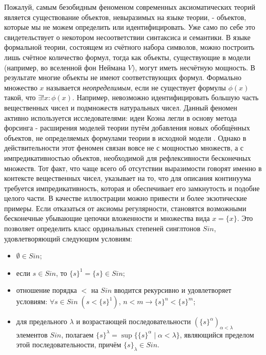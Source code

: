 \documentclass[12pt]{article}
\begin{document}
Пожалуй, самым безобидным феноменом современных аксиоматических теорий является существование объектов, невыразимых на языке теории, - объектов, которые мы не можем определить или идентифицировать. Уже само по себе это свидетельствует о некотором несоответствии синтаксиса и семантики. В языке формальной теории, состоящем из счётного набора символов, можно построить лишь счётное количество формул, тогда как объекты, существующие в модели (например, во вселенной фон Неймана $V$), могут иметь несчётную мощность. В результате многие объекты не имеют соответствующих формул. Формально множество $x$ называется {\it неопределимым}, если не существует формулы $\phi(x)$ такой, что $\exists! x : \phi(x)$. Например, невозможно идентифицировать большую часть вещественных чисел и подмножеств натуральных чисел. Данный феномен активно используется исследователями: идеи Коэна легли в основу метода форсинга - расширения моделей теории путём добавления новых обобщённых объектов, не определяемых формулами теории в исходной модели \cite{forcing}. Однако в действительности этот феномен связан вовсе не с мощностью множеств, а с импредикативностью объектов, необходимой для рефлексивности бесконечных множеств. Тот факт, что чаще всего об отсутствии выразимости говорят именно в контексте вещественных чисел, указывает на то, что для описания континуума требуется импредикативность, которая и обеспечивает его замкнутость и подобие целого части. В качестве иллюстрации можно привести и более экзотические примеры. Если отказаться от аксиомы регулярности, становятся возможными бесконечные убывающие цепочки вложенности и множества вида $x = \{x\}$. Это позволяет определить класс ординальных степеней синглтонов $Sin$, удовлетворяющий следующим условиям:
\begin{itemize}
    \item $\emptyset \in Sin$;
    \item если $s \in Sin$, то $\{ s \}^1 = \{ s \} \in Sin$;
    \item отношение порядка $<$ на $Sin$ вводится рекурсивно и удовлетворяет условиям: $\forall s \in Sin \; (s < \{ s \}^1)$, $n < m \to \{ s \}^n < \{ s \}^m$;
    \item для предельного $\lambda$ и возрастающей последовательности $(\{ s \}^{\alpha})_{\alpha < \lambda}$ элементов $Sin$, полагаем $\{ s \}^{\lambda} = \sup \{ \{ s \}^{\alpha} \mid \alpha < \lambda \}$, являющийся пределом этой последовательности, причём $\{ s \}_{\lambda} \in Sin$.
\end{itemize}
\end{document}
